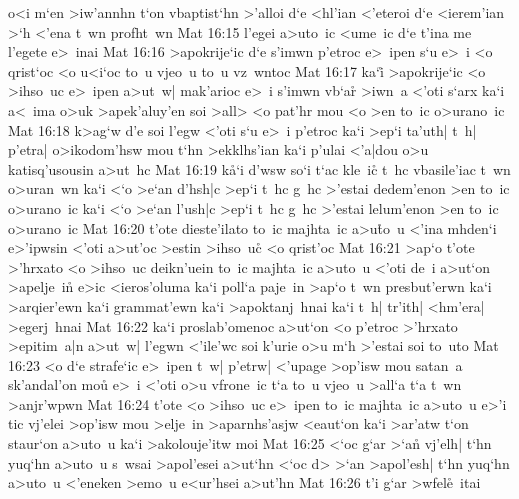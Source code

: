o<i
m`en
>iw'annhn
t`on
vbaptist`hn
>'alloi
d`e
<hl'ian
<'eteroi
d`e
<ierem'ian
>`h
<'ena
t~wn
profht~wn\bibvsend
\vs Mat 16:15
l'egei
a>uto~ic
<ume~ic
d`e
t'ina
me
l'egete
e>~inai\bibvsend
\vs Mat 16:16
>apokrije`ic
d`e
s'imwn
p'etroc
e>~ipen
s`u
e>~i
<o
qrist`oc
<o
u<i`oc
to~u
vjeo~u
to~u
vz~wntoc\bibvsend
\vs Mat 16:17
ka`i\r{}
>apokrije`ic
<o
>ihso~uc
e>~ipen
a>ut~w|
mak'arioc
e>~i
s'imwn
vb`ar\r{}
>iwn~a
<'oti
s`arx
ka`i
a<~ima
o>uk
>apek'aluy'en
soi
>all>
<o
pat'hr
mou
<o
>en
to~ic
o>urano~ic\bibvsend
\vs Mat 16:18
k>ag`w
d'e
soi
l'egw
<'oti
s`u
e>~i
p'etroc
ka`i
>ep`i
ta'uth|
t~h|
p'etra|
o>ikodom'hsw
mou
t`hn
>ekklhs'ian
ka`i
p'ulai
<'a|dou
o>u
katisq'usousin
a>ut~hc\bibvsend
\vs Mat 16:19
k\r{a}`i
d'wsw
so`i
t`ac
kle~i\r{c}
t~hc
vbasile'iac
t~wn
o>uran~wn
ka`i
<`o
>e`an
d'hsh|c
>ep`i
t~hc
g~hc
>'estai
dedem'enon
>en
to~ic
o>urano~ic
ka`i
<`o
>e`an
l'ush|c
>ep`i
t~hc
g~hc
>'estai
lelum'enon
>en
to~ic
o>urano~ic\bibvsend
\vs Mat 16:20
t'ote
dieste'ilato
to~ic
majhta~ic
a>u\r{t}o~u
<'ina
mhden`i
e>'ipwsin
<'oti
a>ut'oc
>estin
>ihso~uc\r{}
<o
qrist'oc\bibvsend
\vs Mat 16:21
>ap`o
t'ote
>'hrxato
<o
>ihso~uc
deikn'uein
to~ic
majhta~ic
a>uto~u
<'oti
de~i
a>ut`on
>apelje~in\r{}
e>ic
<ieros'oluma
ka`i
poll`a
paje~in
>ap`o
t~wn
presbut'erwn
ka`i
>arqier'ewn
ka`i
grammat'ewn
ka`i
>apoktanj~hnai
ka`i
t~h|
tr'ith|
<hm'era|
>egerj~hnai\bibvsend
\vs Mat 16:22
ka`i
proslab'omenoc
a>ut`on
<o
p'etroc
>'hrxato
>epitim~a|n
a>ut~w|
l'egwn
<'ile'wc
soi
k'urie
o>u
m`h
>'estai
soi
to~uto\bibvsend
\vs Mat 16:23
<o
d`e
strafe`ic
e>~ipen
t~w|
p'etrw|
<'upage
>op'isw
mou
satan~a
sk'andal'on
mou\r{}
e>~i
<'oti
o>u
vfrone~ic
t`a
to~u
vjeo~u
>all`a
t`a
t~wn
>anjr'wpwn\bibvsend
\vs Mat 16:24
t'ote
<o
>ihso~uc
e>~ipen
to~ic
majhta~ic
a>uto~u
e>'i
tic
vj'elei
>op'isw
mou
>elje~in
>aparnhs'asjw
<eaut`on
ka`i
>ar'atw
t`on
staur`on
a>uto~u
ka`i
>akolouje'itw
moi\bibvsend
\vs Mat 16:25
<`oc
g`ar
>`a\r{n}
vj'elh|
t`hn
yuq`hn
a>uto~u
s~wsai
>apol'esei
a>ut`hn
<`oc
d>
>`an
>apol'esh|
t`hn
yuq`hn
a>uto~u
<'eneken
>emo~u
e<ur'hsei
a>ut'hn\bibvsend
\vs Mat 16:26
t'i
g`ar
>wfel\r{e}~itai
